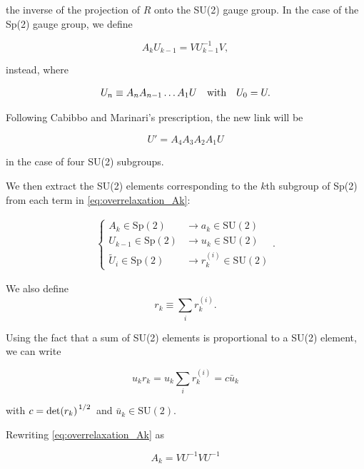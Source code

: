 \documentclass[reqno,12pt]{article}
\numberwithin{equation}{section}
\newcommand{\SU}{\mathrm{SU}}
\newcommand{\Sp}{\mathrm{Sp}}
\begin{document}
the inverse of the projection of $R$ onto the SU(2) gauge group. In the case of the Sp(2) gauge group, 
we define 

\begin{equation} \label{eq:overrelaxation_Ak}
	A_k U_{k-1} = V U_{k-1}^{-1} V,
\end{equation}

instead, where 

\begin{equation}
	U_{n} \equiv A_n A_{n-1} \dots A_1 U \qq{with} U_0 = U.
\end{equation}

Following Cabibbo and Marinari's prescription, the new link will be

\begin{equation} \label{eq:overrelaxation_newlink}
	U' = A_4 A_3 A_2 A_1 U
\end{equation}

in the case of four SU(2) subgroups.

We then extract the SU(2) elements corresponding to the $k$th subgroup of Sp(2) 
from each term in \eqref{eq:overrelaxation_Ak}:

\begin{eqnarray}
	\begin{cases}
		A_k \in \Sp(2) &\longrightarrow a_k \in \SU(2) \\
		U_{k-1} \in \Sp(2) &\longrightarrow u_k \in \SU(2) \\
		\widetilde{U}_i \in \Sp(2) &\longrightarrow r_k^{(i)} \in \SU(2)
	\end{cases}.
\end{eqnarray}

We also define
\begin{equation}
	r_k \equiv \sum_i r_k^{(i)}.
\end{equation}

Using the fact that a sum of SU(2) elements is proportional to a SU(2) element, we can write

\begin{equation}
	u_k r_k = u_k \sum_i r_k^{(i)} = c \bar{u}_k
\end{equation}

with $c = \det(r_k)^{\flatfrac{1}{2}}$ and $\bar{u}_k \in \SU(2)$.

Rewriting \eqref{eq:overrelaxation_Ak} as

\begin{equation}
	A_k = V U^{-1} V U^{-1}
\end{equation}
\end{document}
